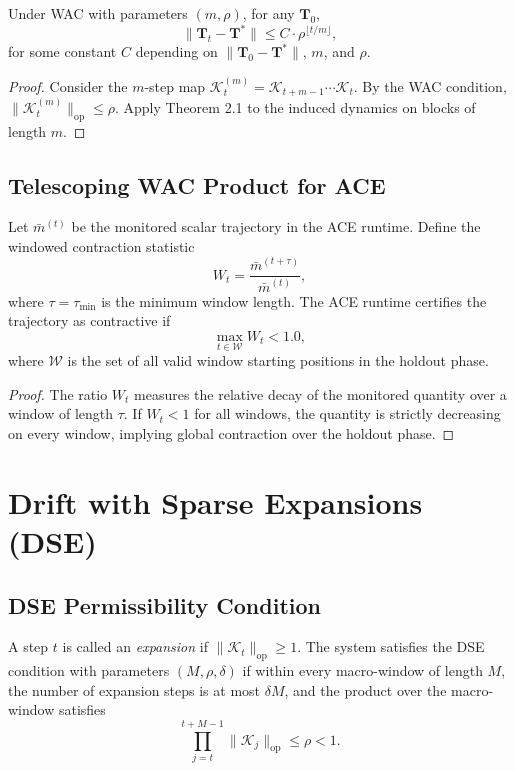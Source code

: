\documentclass[11pt]{article}
\begin{document}
\begin{theorem}
Under WAC with parameters $(m, \rho)$, for any $\mathbf{T}_0$,
\[
\|\mathbf{T}_t - \mathbf{T}^*\| \leq C \cdot \rho^{\lfloor t/m \rfloor},
\]
for some constant $C$ depending on $\|\mathbf{T}_0 - \mathbf{T}^*\|$, $m$, and $\rho$.
\end{theorem}

\begin{proof}
Consider the $m$-step map $\mathcal{K}^{(m)}_t = \mathcal{K}_{t+m-1} \cdots \mathcal{K}_t$. By the WAC condition, $\|\mathcal{K}^{(m)}_t\|_{\mathrm{op}} \leq \rho$. Apply Theorem 2.1 to the induced dynamics on blocks of length $m$.
\end{proof}

\subsection{Telescoping WAC Product for ACE}

\begin{proposition}
Let $\bar{m}^{(t)}$ be the monitored scalar trajectory in the ACE runtime. Define the windowed contraction statistic
\[
W_t = \frac{\bar{m}^{(t+\tau)}}{\bar{m}^{(t)}},
\]
where $\tau = \tau_{\min}$ is the minimum window length. The ACE runtime certifies the trajectory as contractive if
\[
\max_{t \in \mathcal{W}} W_t < 1.0,
\]
where $\mathcal{W}$ is the set of all valid window starting positions in the holdout phase.
\end{proposition}

\begin{proof}
The ratio $W_t$ measures the relative decay of the monitored quantity over a window of length $\tau$. If $W_t < 1$ for all windows, the quantity is strictly decreasing on every window, implying global contraction over the holdout phase.
\end{proof}

\section{Drift with Sparse Expansions (DSE)}

\subsection{DSE Permissibility Condition}

\begin{definition}
A step $t$ is called an \emph{expansion} if $\|\mathcal{K}_t\|_{\mathrm{op}} \geq 1$. The system satisfies the DSE condition with parameters $(M, \rho, \delta)$ if within every macro-window of length $M$, the number of expansion steps is at most $\delta M$, and the product over the macro-window satisfies
\[
\prod_{j=t}^{t+M-1} \|\mathcal{K}_j\|_{\mathrm{op}} \leq \rho < 1.
\]
\end{definition}
\end{document}
